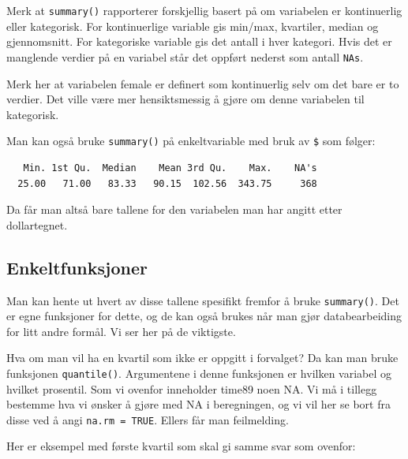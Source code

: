 \documentclass[
  letterpaper,
  DIV=11,
  numbers=noendperiod]{scrreprt}
\newenvironment{Shaded}{\begin{snugshade}}{\end{snugshade}}
\newcommand{\AttributeTok}[1]{\textcolor[rgb]{0.40,0.45,0.13}{#1}}
\newcommand{\ConstantTok}[1]{\textcolor[rgb]{0.56,0.35,0.01}{#1}}
\newcommand{\DecValTok}[1]{\textcolor[rgb]{0.68,0.00,0.00}{#1}}
\newcommand{\FunctionTok}[1]{\textcolor[rgb]{0.28,0.35,0.67}{#1}}
\newcommand{\NormalTok}[1]{\textcolor[rgb]{0.00,0.23,0.31}{#1}}
\newcommand{\SpecialCharTok}[1]{\textcolor[rgb]{0.37,0.37,0.37}{#1}}
\theoremstyle{definition}
\theoremstyle{remark}
\begin{document}
Merk at \texttt{summary()} rapporterer forskjellig basert på om
variabelen er kontinuerlig eller kategorisk. For kontinuerlige variable
gis min/max, kvartiler, median og gjennomsnitt. For kategoriske variable
gis det antall i hver kategori. Hvis det er manglende verdier på en
variabel står det oppført nederst som antall
\texttt{NA\textquotesingle{}s}.

Merk her at variabelen female er definert som kontinuerlig selv om det
bare er to verdier. Det ville være mer hensiktsmessig å gjøre om denne
variabelen til kategorisk.

Man kan også bruke \texttt{summary()} på enkeltvariable med bruk av
\texttt{\$} som følger:

\begin{Shaded}
\end{Shaded}

\begin{verbatim}
   Min. 1st Qu.  Median    Mean 3rd Qu.    Max.    NA's 
  25.00   71.00   83.33   90.15  102.56  343.75     368 
\end{verbatim}

Da får man altså bare tallene for den variabelen man har angitt etter
dollartegnet.

\hypertarget{enkeltfunksjoner}{%
\subsection{Enkeltfunksjoner}\label{enkeltfunksjoner}}

Man kan hente ut hvert av disse tallene spesifikt fremfor å bruke
\texttt{summary()}. Det er egne funksjoner for dette, og de kan også
brukes når man gjør databearbeiding for litt andre formål. Vi ser her på
de viktigste.

Hva om man vil ha en kvartil som ikke er oppgitt i forvalget? Da kan man
bruke funksjonen \texttt{quantile()}. Argumentene i denne funksjonen er
hvilken variabel og hvilket prosentil. Som vi ovenfor inneholder time89
noen NA. Vi må i tillegg bestemme hva vi ønsker å gjøre med NA i
beregningen, og vi vil her se bort fra disse ved å angi
\texttt{na.rm\ =\ TRUE}. Ellers får man feilmelding.

Her er eksempel med første kvartil som skal gi samme svar som ovenfor:

\begin{Shaded}
\end{Shaded}
\end{document}
